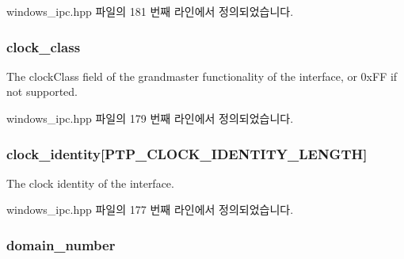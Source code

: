 windows\+\_\+ipc.\+hpp 파일의 181 번째 라인에서 정의되었습니다.

\subsubsection[{\texorpdfstring{clock\+\_\+class}{clock_class}}]{ clock\+\_\+class\hspace{0.3cm}{\ttfamily [inherited]}}\hypertarget{class_offset_aafe98ca785cdce0ce5eaa26f2930d2fe}{}\label{class_offset_aafe98ca785cdce0ce5eaa26f2930d2fe}


The clock\+Class field of the grandmaster functionality of the interface, or 0x\+FF if not supported. 



windows\+\_\+ipc.\+hpp 파일의 179 번째 라인에서 정의되었습니다.

\subsubsection[{\texorpdfstring{clock\+\_\+identity}{clock_identity}}]{ clock\+\_\+identity\mbox{[}{\bf P\+T\+P\+\_\+\+C\+L\+O\+C\+K\+\_\+\+I\+D\+E\+N\+T\+I\+T\+Y\+\_\+\+L\+E\+N\+G\+TH}\mbox{]}\hspace{0.3cm}{\ttfamily [inherited]}}\hypertarget{class_offset_a9efbd85d909d77f7fd70f9f8391c49fa}{}\label{class_offset_a9efbd85d909d77f7fd70f9f8391c49fa}


The clock identity of the interface. 



windows\+\_\+ipc.\+hpp 파일의 177 번째 라인에서 정의되었습니다.

\subsubsection[{\texorpdfstring{domain\+\_\+number}{domain_number}}]{ domain\+\_\+number\hspace{0.3cm}{\ttfamily [inherited]}}\hypertarget{class_offset_a96702548f5b9222af26319c695764b29}{}\label{class_offset_a96702548f5b9222af26319c695764b29}


